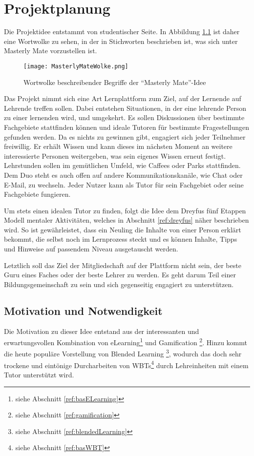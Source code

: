 \chapter{Projektplanung}\label{ref:projektPlanung}
Die Projektidee entstammt von studentischer Seite. In Abbildung
\ref{ref:wolkeMM} ist daher eine Wortwolke zu sehen, in der in Stichworten
beschrieben ist, was sich unter Masterly Mate vorzustellen ist.

\begin{figure}[H]
\texttt{[image: MasterlyMateWolke.png]}
\caption{Wortwolke beschreibender Begriffe der "`Masterly
Mate"'-Idee}\label{ref:wolkeMM}
\end{figure}

Das Projekt nimmt sich eine Art Lernplattform zum Ziel, auf der Lernende auf
Lehrende treffen sollen. Dabei entstehen Situationen, in der eine lehrende
Person zu einer lernenden wird, und umgekehrt. Es sollen Diskussionen über
bestimmte Fachgebiete stattfinden können und ideale Tutoren für bestimmte
Fragestellungen gefunden werden. Da es nichts zu gewinnen gibt, engagiert sich
jeder Teilnehmer freiwillig. Er erhält Wissen und kann dieses im nächsten Moment
an weitere interessierte Personen weitergeben, was sein eigenes Wissen erneut
festigt. Lehrstunden sollen im gemütlichen Umfeld, wie Caffees oder Parks
stattfinden. Dem Duo steht es auch offen auf andere Kommunikationskanäle, wie
Chat oder E-Mail, zu wechseln. Jeder Nutzer kann als Tutor für sein Fachgebiet
oder seine Fachgebiete fungieren.

Um stets einen idealen Tutor zu finden, folgt die Idee dem Dreyfus fünf Etappen
Modell mentaler Aktivitäten, welches in Abschnitt \ref{ref:dreyfus} näher
beschrieben wird. So ist gewährleistet, dass ein Neuling die Inhalte von einer
Person erklärt bekommt, die selbst noch im Lernprozess steckt und es können
Inhalte, Tipps und Hinweise auf passendem Niveau ausgetauscht werden.

Letztlich soll das Ziel der Mitgliedschaft auf der Plattform nicht sein, der
beste Guru eines Faches oder der beste Lehrer zu werden. Es geht darum
Teil einer Bildungsgemeinschaft zu sein und sich gegenseitig engagiert zu
unterstützen.

\section{Motivation und Notwendigkeit}\label{ref:projectMotivation}
Die Motivation zu dieser Idee entstand aus der interessanten und
erwartungsvollen Kombination von eLearning\footnote{siehe Abschnitt
\ref{ref:basELearning}} und Gamification \footnote{siehe Abschnitt
\ref{ref:gamification}}. Hinzu kommt die heute populäre Vorstellung von Blended
Learning \footnote{siehe Abschnitt \ref{ref:blendedLearning}}, wodurch das doch
sehr trockene und eintönige Durcharbeiten von WBTs\footnote{siehe Abschnitt
\ref{ref:basWBT}} durch Lehreinheiten mit einem Tutor unterstützt wird.

